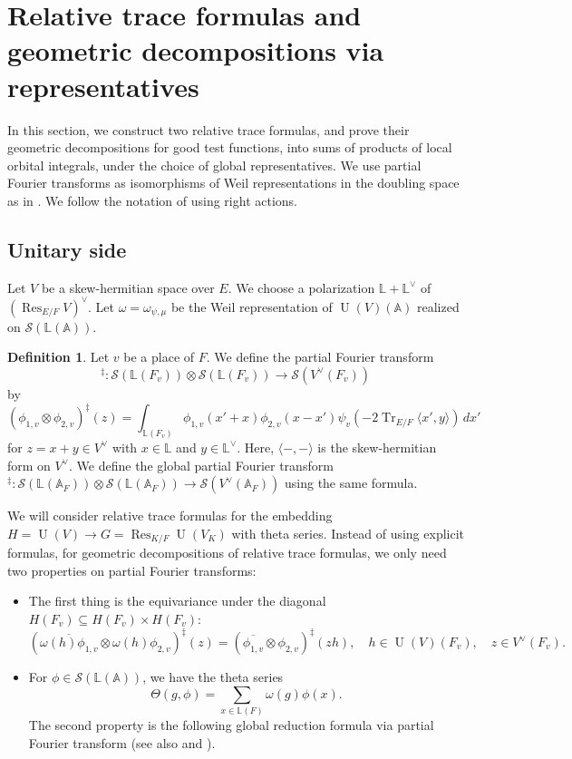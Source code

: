 \documentclass[11pt, reqno]{amsart}
\numberwithin{equation}{subsection}
\theoremstyle{plain}
\theoremstyle{definition}
\newtheorem{definition}[proposition]{Definition}
\newcommand{\BA}{\mathbb A}
\newcommand{\BL}{\mathbb L}
\newcommand{\CS}{\mathcal{S}}
\renewcommand{\AA}{\mathbb A}
\newcommand{\LL}{\mathbb L}
\newcommand{\ol}{\overline}
\newcommand{\cS}{\mathcal S}
\DeclareMathOperator{\Res}{Res}
\DeclareMathOperator{\Tr}{Tr}
\DeclareMathOperator{\U}{U}
\begin{document}
\section{Relative trace formulas and geometric decompositions via representatives} \label{section: decomp and orbits}

In this section, we construct two relative trace formulas, and prove their geometric decompositions for good test functions, into sums of products of local orbital integrals, under the choice of global representatives. We use partial Fourier transforms as isomorphisms of Weil representations in the doubling space as in \cite{Li1992}. We follow the notation of \cite{TGGP-Wang} using right actions.

\subsection{Unitary side}

Let $V$ be a skew-hermitian space over $E$. We choose a 
polarization $\LL + \LL^\vee$ of $(\Res_{E/F} V)^\vee$.
Let $\omega = \omega_{\psi,\mu}$ be the Weil 
representation of $\U(V)(\AA)$ realized on 
$\cS(\BL(\AA))$.

\begin{definition}
Let $v$ be a place of $F$. We define the
partial Fourier transform
\[
^\ddagger \colon \cS(\LL (F_v)) \otimes \cS(\LL (F_v))
\to \cS(V^\vee(F_v))
\]
by
\[
    (\phi_{1,v} \otimes \phi_{2,v})^\ddagger(z)
    = \int_{\LL(F_v)} \phi_{1,v}(x' + x)
    \phi_{2,v}(x - x')
    \psi_v(-2\Tr_{E/F}\langle x', y\rangle)\,dx'
\]
for $z = x + y \in V^\vee$
with $x \in \LL$ and $y \in \LL^\vee$.
Here, $\langle -, -\rangle$ is the skew-hermitian form on $V^\vee$.
We define the global partial Fourier transform
$^\ddagger \colon \cS(\LL(\BA_F)) \otimes \cS(\LL(\BA_F)) \to \cS(V^\vee(\BA_F))$ using the same formula.
\end{definition}

We will consider relative trace formulas for the embedding $H=\U(V) \to G=\Res_{K/F} \U(V_K)$ with theta series. Instead of using explicit formulas, for geometric decompositions of relative trace formulas, we only need two properties on partial Fourier transforms:

\begin{itemize}
    \item The first thing is the equivariance under the diagonal $H(F_v) \subseteq H(F_v) \times H(F_v)$:
\begin{equation}
  ( \overline{\omega(h)\phi_{1,v} } \otimes 
  \omega(h)\phi_{2,v})^\ddagger(z)= (\ol{\phi_{1,v}} 
  \otimes \phi_{2,v})^\ddagger(zh), \quad h \in \U(V)
  (F_v), \quad z \in V^\vee(F_v).
\end{equation}
    \item For $\phi \in\CS(\mathbb L(\AA))$, we have the theta series
\[
\Theta(g, \phi)=\sum_{x \in \mathbb L(F)} \omega(g)\phi(x).
\]
The second property is the following global reduction formula via partial Fourier transform (see also \cite[Proposition 2.2]{HKS-Theta1996} and
\cite[Lemma 5.3]{Liu2014relative}).


\end{itemize}
\end{document}
